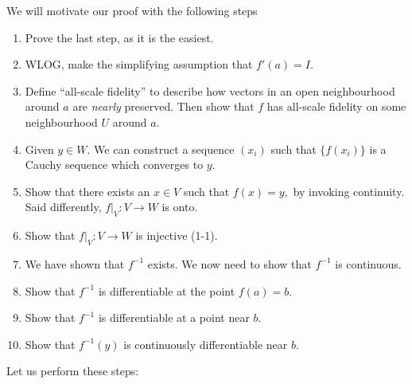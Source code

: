 \documentclass{article}
\numberwithin{equation}{section}
\begin{document}
We will motivate our proof with the following steps
\begin{enumerate}
    \item Prove the last step, as it is the easiest.
    \item WLOG, make the simplifying assumption that $f'(a) = I$.
    \item Define ``all-scale fidelity'' to describe how vectors in an open neighbourhood around $a$ are \textit{nearly} preserved. Then show that $f$ has all-scale fidelity on some neighbourhood $U$ around $a$.
    \item Given $y\in W$. We can construct a sequence $(x_i)$ such that $\{f(x_i)\}$ is a Cauchy sequence which converges to $y.$
    \item Show that there exists an $x\in V$ such that $f(x)=y,$ by invoking continuity. Said differently, $f|_V: V\rightarrow W$ is onto.
    \item Show that $f|_V: V\rightarrow W$ is injective (1-1).
    \item We have shown that $f^{-1}$ exists. We now need to show that $f^{-1}$ is continuous.
    \item Show that $f^{-1}$ is differentiable at the point $f(a)=b$.
    \item Show that $f^{-1}$ is differentiable at a point near $b$.
    \item Show that $f^{-1}(y)$ is continuously differentiable near $b$.
\end{enumerate}
Let us perform these steps:
\end{document}
